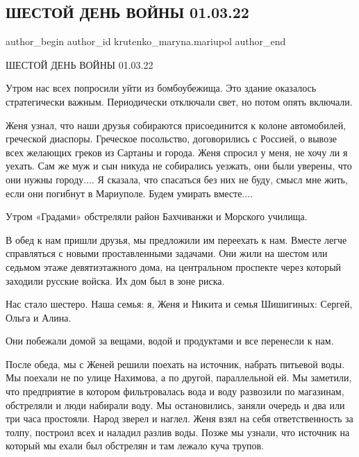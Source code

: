 
 
 
 
 

\subsection{ШЕСТОЙ ДЕНЬ ВОЙНЫ 01.03.22}
\label{sec:01_03_2023.fb.krutenko_maryna.mariupol.1.shestoi_den_voini_01}

\ifcmt
 author_begin
   author_id krutenko_maryna.mariupol
 author_end
\fi

ШЕСТОЙ ДЕНЬ ВОЙНЫ 01.03.22

Утром нас всех попросили уйти из бомбоубежища. Это здание оказалось
стратегически важным.  Периодически отключали свет, но потом опять включали. 

Женя узнал, что наши друзья собираются присоединится к колоне автомобилей,
греческой диаспоры. Греческое посольство, договорились с Россией, о вывозе всех
желающих греков из Сартаны и города. Женя спросил у меня, не хочу ли я уехать.
Сам же муж и сын никуда не собирались уезжать, они были уверены, что они нужны
городу.... Я сказала, что спасаться без них не буду, смысл мне жить, если они
погибнут в Мариуполе. Будем умирать вместе....

Утром «Градами» обстреляли район Бахчиванжи  и Морского училища. 

В обед к нам пришли друзья, мы предложили им переехать к нам. Вместе легче
справляться с новыми проставленными задачами. Они жили на шестом или седьмом
этаже девятиэтажного дома, на центральном проспекте через который заходили
русские войска. Их дом был в зоне риска. 

Нас стало шестеро.  Наша семья: я, Женя и Никита и семья Шишигиных: Сергей,
Ольга и Алина. 

Они побежали домой за вещами, водой и продуктами и все перенесли к нам. 

После обеда, мы с Женей решили поехать на источник, набрать питьевой воды. Мы
поехали не по улице Нахимова, а по другой, параллельной ей. Мы заметили, что
предприятие в котором фильтровалась вода и воду развозили по магазинам,
обстреляли и люди набирали воду. Мы остановились, заняли очередь и два или три
часа простояли. Народ зверел и наглел. Женя взял на себя ответственность за
толпу, построил всех и наладил разлив воды. Позже мы узнали, что источник на
который мы ехали был обстрелян и там лежало куча трупов.

